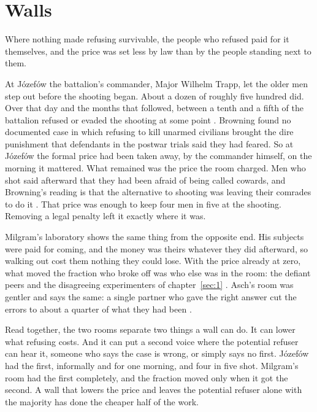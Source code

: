 \section{Walls}
\label{sec:reproduced.walls}
Where nothing made refusing survivable, the people who refused paid for it themselves, and the price was set less by law than by the people standing next to them.

At Józefów the battalion's commander, Major Wilhelm Trapp, let the older men step out before the shooting began. About a dozen of roughly five hundred did. Over that day and the months that followed, between a tenth and a fifth of the battalion refused or evaded the shooting at some point \autocite{browning1992ordinary}. Browning found no documented case in which refusing to kill unarmed civilians brought the dire punishment that defendants in the postwar trials said they had feared. So at Józefów the formal price had been taken away, by the commander himself, on the morning it mattered. What remained was the price the room charged. Men who shot said afterward that they had been afraid of being called cowards, and Browning's reading is that the alternative to shooting was leaving their comrades to do it \autocite{browning1992ordinary}. That price was enough to keep four men in five at the shooting. Removing a legal penalty left it exactly where it was.

Milgram's laboratory shows the same thing from the opposite end. His subjects were paid for coming, and the money was theirs whatever they did afterward, so walking out cost them nothing they could lose. With the price already at zero, what moved the fraction who broke off was who else was in the room: the defiant peers and the disagreeing experimenters of chapter~\ref{sec:1} \autocite{milgram1974obedience}. Asch's room was gentler and says the same: a single partner who gave the right answer cut the errors to about a quarter of what they had been \autocite{asch1956studies}.

Read together, the two rooms separate two things a wall can do. It can lower what refusing costs. And it can put a second voice where the potential refuser can hear it, someone who says the case is wrong, or simply says no first. Józefów had the first, informally and for one morning, and four in five shot. Milgram's room had the first completely, and the fraction moved only when it got the second. A wall that lowers the price and leaves the potential refuser alone with the majority has done the cheaper half of the work.

